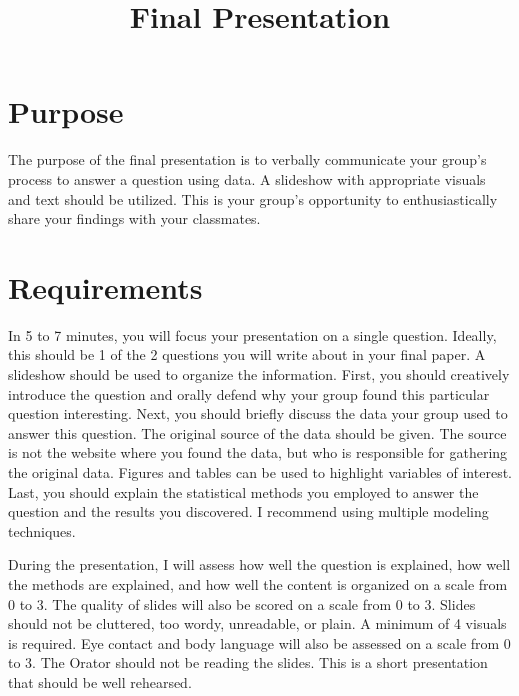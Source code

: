 \documentclass[
]{article}
\title{\textbf{Final Presentation}}
\author{}
\date{\vspace{-2.5em}}
\begin{document}
\maketitle

{
\setcounter{tocdepth}{2}
\tableofcontents
}
\hypertarget{purpose}{%
\section{\texorpdfstring{\textbf{Purpose}}{Purpose}}\label{purpose}}

The purpose of the final presentation is to verbally communicate your
group's process to answer a question using data. A slideshow with
appropriate visuals and text should be utilized. This is your group's
opportunity to enthusiastically share your findings with your
classmates.

\hypertarget{requirements}{%
\section{\texorpdfstring{\textbf{Requirements}}{Requirements}}\label{requirements}}

In 5 to 7 minutes, you will focus your presentation on a single
question. Ideally, this should be 1 of the 2 questions you will write
about in your final paper. A slideshow should be used to organize the
information. First, you should creatively introduce the question and
orally defend why your group found this particular question interesting.
Next, you should briefly discuss the data your group used to answer this
question. The original source of the data should be given. The source is
not the website where you found the data, but who is responsible for
gathering the original data. Figures and tables can be used to highlight
variables of interest. Last, you should explain the statistical methods
you employed to answer the question and the results you discovered. I
recommend using multiple modeling techniques.

During the presentation, I will assess how well the question is
explained, how well the methods are explained, and how well the content
is organized on a scale from 0 to 3. The quality of slides will also be
scored on a scale from 0 to 3. Slides should not be cluttered, too
wordy, unreadable, or plain. A minimum of 4 visuals is required. Eye
contact and body language will also be assessed on a scale from 0 to 3.
The Orator should not be reading the slides. This is a short
presentation that should be well rehearsed.
\end{document}
